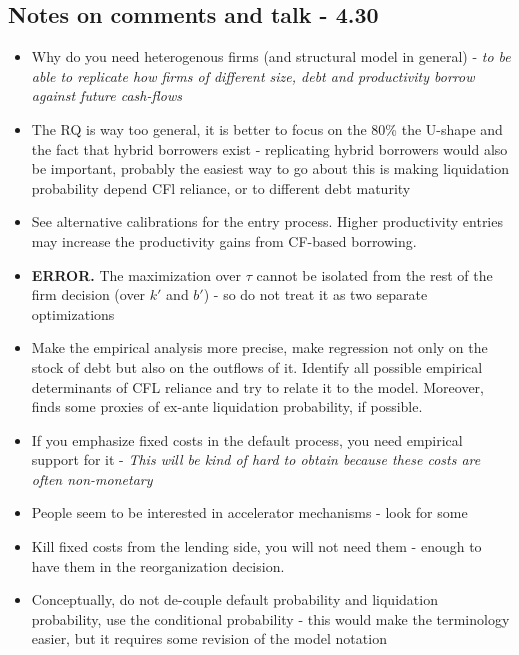 \documentclass[12pt]{article}
\begin{document}
\subsection*{Notes on comments and talk - 4.30}
\begin{itemize} \setlength\itemsep{0em} \small
    \item Why do you need heterogenous firms (and structural model in general) - \textit{to be able to replicate how firms of different size, debt and productivity borrow against future cash-flows}
    \item The RQ is way too general, it is better to focus on the 80\% the U-shape and the fact that hybrid borrowers exist - replicating hybrid borrowers would also be important, probably the easiest way to go about this is making liquidation probability depend CFl reliance, or to different debt maturity
    \item See alternative calibrations for the entry process. Higher productivity entries may increase the productivity gains from CF-based borrowing. 
    \item \textbf{ERROR.} The maximization over $\tau$ cannot be isolated from the rest of the firm decision (over $k'$ and $b'$) - so do not treat it as two separate optimizations
    \item Make the empirical analysis more precise, make regression not only on the stock of debt but also on the outflows of it. Identify all possible empirical determinants of CFL reliance and try to relate it to the model. Moreover, finds some proxies of ex-ante liquidation probability, if possible. 
    \item If you emphasize fixed costs in the default process, you need empirical support for it - \textit{This will be kind of hard to obtain because these costs are often non-monetary}
    \item People seem to be interested in accelerator mechanisms - look for some 
    \item Kill fixed costs from the lending side, you will not need them - enough to have them in the reorganization decision. 
    \item Conceptually, do not de-couple default probability and liquidation probability, use the conditional probability - this would make the terminology easier, but it requires some revision of the model notation
\end{itemize} \normalsize




 
\end{document}
